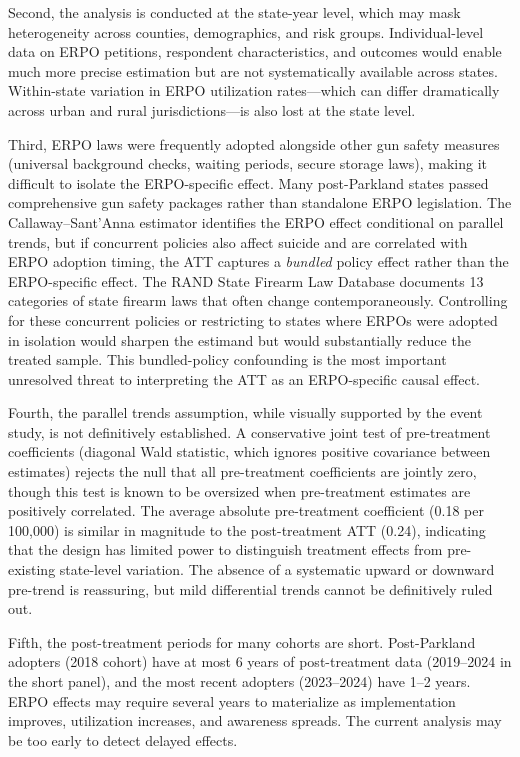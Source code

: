 \documentclass[12pt]{article}
\begin{document}
Second, the analysis is conducted at the state-year level, which may mask heterogeneity across counties, demographics, and risk groups. Individual-level data on ERPO petitions, respondent characteristics, and outcomes would enable much more precise estimation but are not systematically available across states. Within-state variation in ERPO utilization rates---which can differ dramatically across urban and rural jurisdictions---is also lost at the state level.

Third, ERPO laws were frequently adopted alongside other gun safety measures (universal background checks, waiting periods, secure storage laws), making it difficult to isolate the ERPO-specific effect. Many post-Parkland states passed comprehensive gun safety packages rather than standalone ERPO legislation. The Callaway--Sant'Anna estimator identifies the ERPO effect conditional on parallel trends, but if concurrent policies also affect suicide and are correlated with ERPO adoption timing, the ATT captures a \textit{bundled} policy effect rather than the ERPO-specific effect. The RAND State Firearm Law Database \citep{rand2023effects} documents 13 categories of state firearm laws that often change contemporaneously. Controlling for these concurrent policies or restricting to states where ERPOs were adopted in isolation would sharpen the estimand but would substantially reduce the treated sample. This bundled-policy confounding is the most important unresolved threat to interpreting the ATT as an ERPO-specific causal effect.

Fourth, the parallel trends assumption, while visually supported by the event study, is not definitively established. A conservative joint test of pre-treatment coefficients (diagonal Wald statistic, which ignores positive covariance between estimates) rejects the null that all pre-treatment coefficients are jointly zero, though this test is known to be oversized when pre-treatment estimates are positively correlated. The average absolute pre-treatment coefficient (0.18 per 100,000) is similar in magnitude to the post-treatment ATT (0.24), indicating that the design has limited power to distinguish treatment effects from pre-existing state-level variation. The absence of a systematic upward or downward pre-trend is reassuring, but mild differential trends cannot be definitively ruled out.

Fifth, the post-treatment periods for many cohorts are short. Post-Parkland adopters (2018 cohort) have at most 6 years of post-treatment data (2019--2024 in the short panel), and the most recent adopters (2023--2024) have 1--2 years. ERPO effects may require several years to materialize as implementation improves, utilization increases, and awareness spreads. The current analysis may be too early to detect delayed effects.
\end{document}

